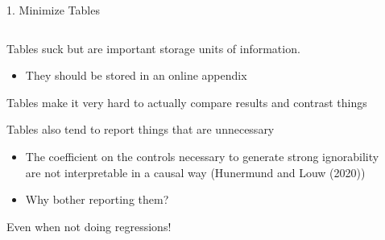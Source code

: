\documentclass[notes,11pt, aspectratio=169]{beamer}
\newcommand\1{\operatorname{\mathbbm{1}}\indicatorfence}
\newenvironment{wideitemize}{\itemize\addtolength{\itemsep}{10pt}}{\enditemize}
\begin{document}
\begin{frame}{1. Minimize Tables}
  \begin{columns}[T] %
    \begin{column}{.6\textwidth}
      \begin{wideitemize}
      \item Tables suck but are important storage units of
        information.
        \begin{itemize}
        \item They should be stored in an online appendix
        \end{itemize}
      \item Tables make it very hard to actually compare results and contrast things
      \item Tables also tend to report things that are unnecessary
        \begin{itemize}
        \item The coefficient on the controls necessary to generate
          strong ignorability are not interpretable in a causal way (Hunermund and Louw (2020))
        \item Why bother reporting them?
        \end{itemize}
      \item Even when not doing regressions!
      \end{wideitemize}
  \end{column}%
  \hfill%
  \begin{column}{.4\textwidth}
  \end{column}
\end{columns}
\end{frame}
\end{document}

